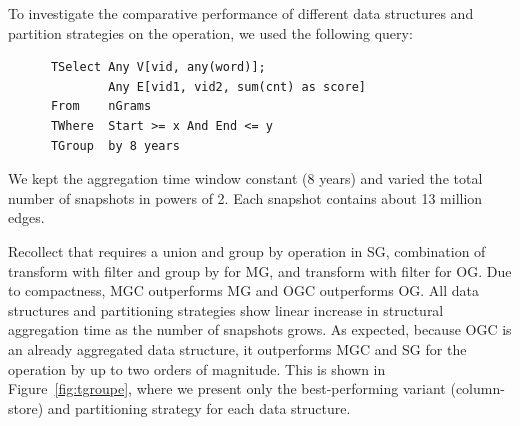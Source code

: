 To investigate the comparative performance of different data
structures and partition strategies on the  operation, we used
the following query:

\begin{small}
\begin{verbatim}
      TSelect Any V[vid, any(word)];
              Any E[vid1, vid2, sum(cnt) as score]
      From    nGrams
      TWhere  Start >= x And End <= y
      TGroup  by 8 years
\end{verbatim}
\end{small}

We kept the aggregation time window constant (8 years) and varied the
total number of snapshots in powers of 2.  Each snapshot contains
about 13 million edges.

Recollect that  requires a union and group by operation
in SG, combination of transform with filter and group by for MG, and
transform with filter for OG.  Due to compactness, MGC outperforms MG
and OGC outperforms OG.  All data structures and partitioning
strategies show linear increase in structural aggregation time as the
number of snapshots grows.  As expected, because OGC is an already
aggregated data structure, it outperforms MGC and SG for the
 operation by up to two orders of magnitude.  This is
shown in Figure~\ref{fig:tgroupe}, where we present only the
best-performing variant (column-store) and partitioning strategy for
each data structure.


